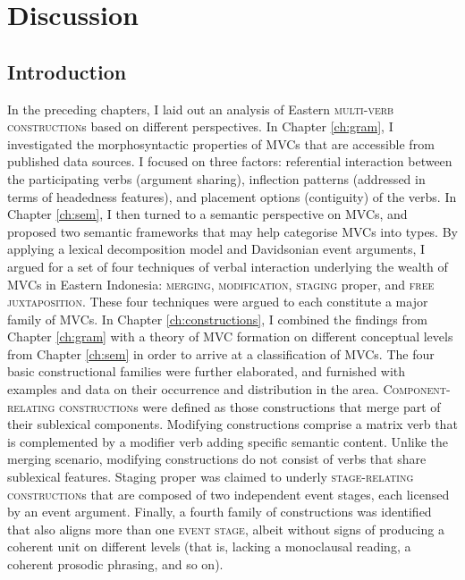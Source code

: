 \chapter{Discussion}\label{ch:discussion}
\section{Introduction}

In the preceding chapters, I laid out an analysis of Eastern  \textsc{multi-verb construction}s based on different perspectives. In Chapter \ref{ch:gram}, I investigated the morphosyntactic properties of MVCs that are accessible from published data sources. I focused on three factors: referential interaction between the participating verbs (argument sharing), inflection patterns (addressed in terms of headedness features), and placement options (contiguity) of the verbs. In Chapter \ref{ch:sem}, I then turned to a semantic perspective on MVCs, and proposed two semantic frameworks that may help categorise MVCs into types. By applying a lexical decomposition model and Davidsonian event arguments, I argued for a set of four techniques of verbal interaction underlying the wealth of MVCs in Eastern Indonesia: \textsc{merging}, \textsc{modification}, \textsc{staging} proper, and \textsc{free juxtaposition}. These four techniques were argued to each constitute a major family of MVCs. In Chapter \ref{ch:constructions}, I combined the findings from Chapter \ref{ch:gram} with a theory of MVC formation on different conceptual levels from Chapter \ref{ch:sem} in order to arrive at a classification of MVCs. The four basic constructional families were further elaborated, and furnished with examples and data on their occurrence and distribution in the area. \textsc{Component-relating construction}s were defined as those constructions that merge part of their sublexical components. Modifying constructions comprise a matrix verb that is complemented by a modifier verb adding specific semantic content. Unlike the merging scenario, modifying constructions do not consist of verbs that share sublexical features. Staging proper was claimed to underly \textsc{stage-relating construction}s that are composed of two independent event stages, each licensed by an event argument. Finally, a fourth family of constructions was identified that also aligns more than one \textsc{event stage}, albeit without signs of producing a coherent unit on different levels (that is, lacking a monoclausal reading, a coherent prosodic phrasing, and so on).

